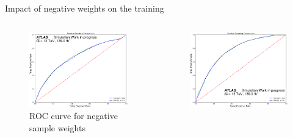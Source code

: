 
\begin{frame}{Impact of negative weights on the training}
    \begin{columns}
        \begin{column}{0.5\textwidth}
            \begin{figure}
                \centering
                \includegraphics[width=\textwidth]{ROC_normalWeights}
                \caption{ROC curve for negative sample weights}
            \end{figure}
        \end{column}
        \begin{column}{0.5\textwidth}
            \begin{figure}
                \centering
                \includegraphics[width=\textwidth]{ROC_absoluteWeights}

\end{figure}
\end{column}
\end{columns}
\end{frame}
